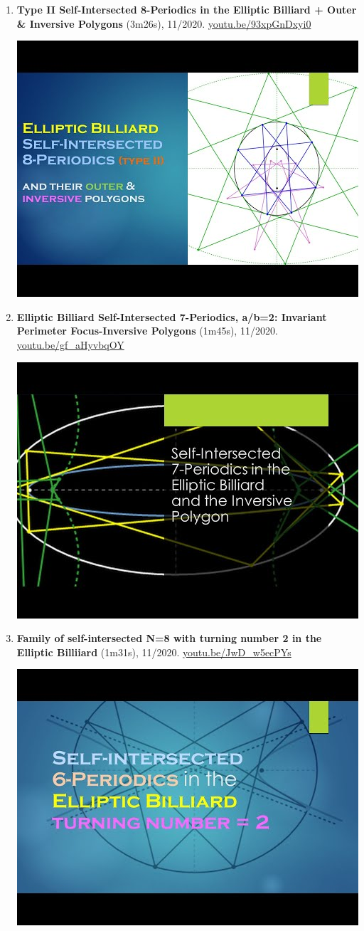 \documentclass[12pt]{article}
\begin{document}
\begin{enumerate}[resume]
% 
\item \textbf{Type II Self-Intersected 8-Periodics in the Elliptic Billiard + Outer \& Inversive Polygons} (3m26s), 11/2020. \href{https://youtu.be/93xpGnDxyi0}{\url{youtu.be/93xpGnDxyi0}}
\begin{center}\includegraphics[width=.5\textwidth]{pics/93xpGnDxyi0.jpg}\end{center}
% 
\item \textbf{Elliptic Billiard Self-Intersected 7-Periodics, a/b=2: Invariant Perimeter Focus-Inversive Polygons} (1m45s), 11/2020. \href{https://youtu.be/gf_aHyvbqOY}{\url{youtu.be/gf\_aHyvbqOY}}
\begin{center}\includegraphics[width=.5\textwidth]{pics/gf_aHyvbqOY.jpg}\end{center}
% 
\item \textbf{Family of self-intersected N=8 with turning number 2 in the Elliptic Billiiard} (1m31s), 11/2020. \href{https://youtu.be/JwD_w5ecPYs}{\url{youtu.be/JwD\_w5ecPYs}}
\begin{center}\includegraphics[width=.5\textwidth]{pics/JwD_w5ecPYs.jpg}\end{center}

\end{enumerate}
\end{document}
